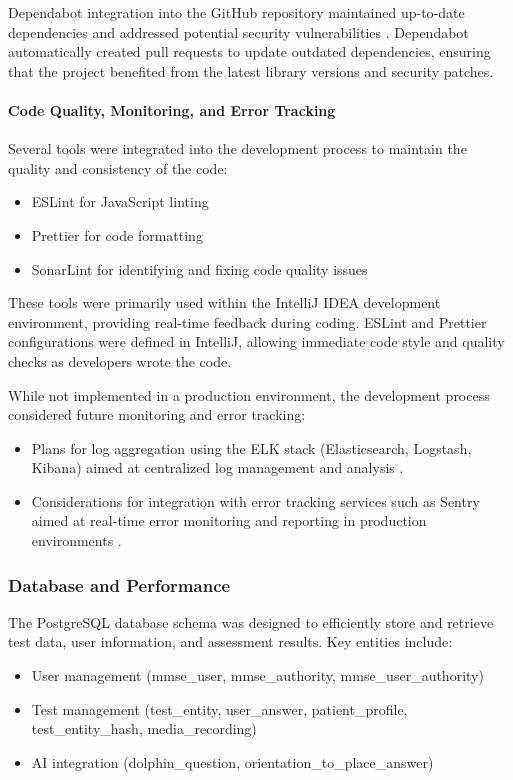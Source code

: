 Dependabot integration into the GitHub repository maintained up-to-date dependencies and addressed potential security vulnerabilities \cite{dependabot}. Dependabot automatically created pull requests to update outdated dependencies, ensuring that the project benefited from the latest library versions and security patches.

\paragraph{Code Quality, Monitoring, and Error Tracking}
Several tools were integrated into the development process to maintain the quality and consistency of the code:
\begin{itemize}
\item ESLint for JavaScript linting
\item Prettier for code formatting
\item SonarLint for identifying and fixing code quality issues
\end{itemize}

These tools were primarily used within the IntelliJ IDEA development environment, providing real-time feedback during coding. ESLint and Prettier configurations were defined in IntelliJ, allowing immediate code style and quality checks as developers wrote the code.

While not implemented in a production environment, the development process considered future monitoring and error tracking:
\begin{itemize}
\item Plans for log aggregation using the ELK stack (Elasticsearch, Logstash, Kibana) aimed at centralized log management and analysis \cite{elk}.
\item Considerations for integration with error tracking services such as Sentry aimed at real-time error monitoring and reporting in production environments \cite{sentry}.
\end{itemize}

\subsubsection{Database and Performance}
The PostgreSQL database schema was designed to efficiently store and retrieve test data, user information, and assessment results. Key entities include:
\begin{itemize}
    \item User management (mmse\_user, mmse\_authority, mmse\_user\_authority)
    \item Test management (test\_entity, user\_answer, patient\_profile, test\_entity\_hash, media\_recording)
    \item AI integration (dolphin\_question, orientation\_to\_place\_answer)
\end{itemize}

